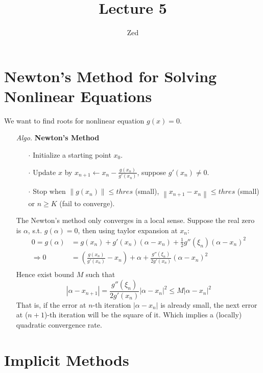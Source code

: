 \documentclass[a4paper, 11pt]{article}
\title{\textbf{Lecture 5}}
\author{Zed}
\begin{document}
\maketitle
\section{Newton's Method for Solving Nonlinear Equations}
We want to find roots for nonlinear equation $g(x)=0$. 
\begin{itemize}
	\item[\textit{Algo.}] \textbf{Newton's Method}
	\begin{itemize}
		\item[$\cdot$] Initialize a starting point $x_0$. 
		\item[$\cdot$] Update $x$ by $x_{n+1} \leftarrow x_n - \frac{g(x_n)}{g'(x_n)}$, suppose $g'(x_n)\ne 0$.
		\item[$\cdot$] Stop when $\left\|g(x_n)\right\| \leq thres$ (small), $\left\|x_{n+1} - x_n\right\| \leq thres$ (small) or $n\geq K$ (fail to converge). 
	\end{itemize}
	The Newton's method only converges in a local sense. Suppose the real zero is $\alpha$, s.t. $g(\alpha)=0$, then using taylor expansion at $x_n$:
	\begin{equation}
		 \begin{split}
		 	0 = g(\alpha) &= g(x_n) + g'(x_n)(\alpha - x_n) + \frac{1}{2}g''(\xi_n)(\alpha - x_n)^2 \\
		 	\Rightarrow 0 &= \left(\frac{g(x_n)}{g'(x_n)} - x_n\right) + \alpha + \frac{g''(\xi_n)}{2g'(x_n)}(\alpha - x_n)^2 \\
		 \end{split}
	\end{equation}
	Hence exist bound $M$ such that 
	$$
	|\alpha - x_{n+1}| = \frac{g''(\xi_n)}{2g'(x_n)}|\alpha - x_n|^2 \leq M|\alpha - x_n|^2
	$$
	That is, if the error at $n$-th iteration $|\alpha - x_n|$ is already small, the next error at ($n+1$)-th iteration will be the square of it. Which implies a (locally) quadratic convergence rate.
\end{itemize}



\section{Implicit Methods}
\end{document}

